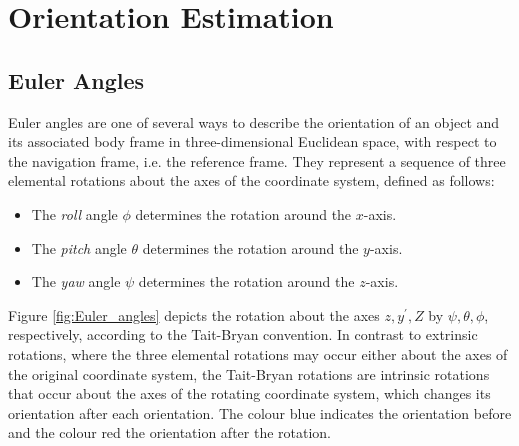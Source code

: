 \chapter{Orientation Estimation}
\label{ch:orientation_estimation}

\section{Euler Angles}

Euler angles are one of several ways to describe the orientation of an object and its associated body frame in three-dimensional Euclidean space, with respect to the navigation frame, i.e. the reference frame. They represent a sequence of three elemental rotations about the axes of the coordinate system, defined as follows:

\begin{itemize}
\item The \emph{roll} angle $\phi$ determines the rotation around the $x$-axis.
\item The \emph{pitch} angle $\theta$ determines the rotation around the $y$-axis.
\item The \emph{yaw} angle $\psi$ determines the rotation around the $z$-axis.
\end{itemize}

\noindent
Figure \ref{fig:Euler_angles} depicts the rotation about the axes $z, y^{'}, Z$ by $\psi, \theta, \phi$, respectively, according to the Tait-Bryan convention. In contrast to extrinsic rotations, where the three elemental rotations may occur either about the axes of the original coordinate system, the Tait-Bryan rotations are intrinsic rotations that occur about the axes of the rotating coordinate system, which changes its orientation after each orientation. The colour blue indicates the orientation before and the colour red the orientation after the rotation.

